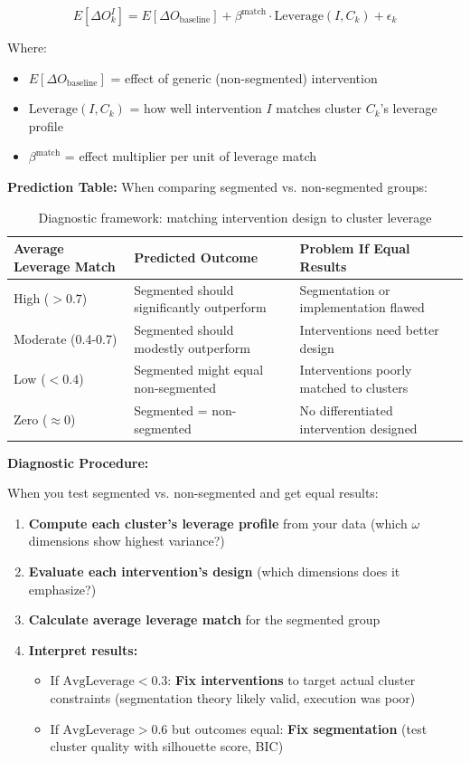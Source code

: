 \begin{equation}
E[\Delta O_k^I] = E[\Delta O_{\text{baseline}}] + \beta^{\text{match}} \cdot \text{Leverage}(I, C_k) + \epsilon_k
\end{equation}

Where:
\begin{itemize}[nosep]
\item $E[\Delta O_{\text{baseline}}]$ = effect of generic (non-segmented) intervention
\item $\text{Leverage}(I, C_k)$ = how well intervention $I$ matches cluster $C_k$'s leverage profile
\item $\beta^{\text{match}}$ = effect multiplier per unit of leverage match
\end{itemize}

\textbf{Prediction Table:} When comparing segmented vs. non-segmented groups:

\begin{table}[h]
\centering
\small
\begin{tabular}{lll}
\toprule
\textbf{Average Leverage Match} & \textbf{Predicted Outcome} & \textbf{Problem If Equal Results} \\
\midrule
High ($> 0.7$) & Segmented should significantly outperform & Segmentation or implementation flawed \\
Moderate (0.4-0.7) & Segmented should modestly outperform & Interventions need better design \\
Low ($< 0.4$) & Segmented might equal non-segmented & Interventions poorly matched to clusters \\
Zero ($\approx 0$) & Segmented = non-segmented & No differentiated intervention designed \\
\bottomrule
\end{tabular}
\caption{Diagnostic framework: matching intervention design to cluster leverage}
\label{tab:leverage-diagnostics}
\end{table}

\textbf{Diagnostic Procedure:}

When you test segmented vs. non-segmented and get equal results:

\begin{enumerate}
\item \textbf{Compute each cluster's leverage profile} from your data (which $\omega$ dimensions
show highest variance?)
\item \textbf{Evaluate each intervention's design} (which dimensions does it emphasize?)
\item \textbf{Calculate average leverage match} for the segmented group
\item \textbf{Interpret results:}
\begin{itemize}[nosep]
\item If $\text{AvgLeverage} < 0.3$: \textbf{Fix interventions} to target actual cluster constraints
(segmentation theory likely valid, execution was poor)
\item If $\text{AvgLeverage} > 0.6$ but outcomes equal: \textbf{Fix segmentation} (test cluster quality
with silhouette score, BIC)
\end{itemize}
\end{enumerate}

